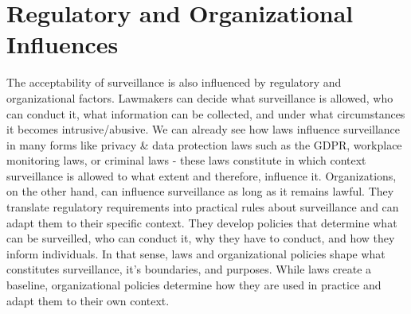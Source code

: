 \documentclass[12pt]{article}
\begin{document}
\section{Regulatory and Organizational Influences}
The acceptability of surveillance is also influenced by regulatory and organizational factors. Lawmakers can decide what surveillance is allowed, who can conduct it, what information can be collected, and under what circumstances it becomes intrusive/abusive. We can already see how laws influence surveillance in many forms like privacy \& data protection laws such as the GDPR, workplace monitoring laws, or criminal laws - these laws constitute in which context surveillance is allowed to what extent and therefore, influence it.
\newline
Organizations, on the other hand, can influence surveillance as long as it remains lawful. They translate regulatory requirements into practical rules about surveillance and can adapt them to their specific context. They develop policies that determine what can be surveilled, who can conduct it, why they have to conduct, and how they inform individuals.
\newline
In that sense, laws and organizational policies shape what constitutes surveillance, it's boundaries, and purposes. While laws create a baseline, organizational policies determine how they are used in practice and adapt them to their own context.
\end{document}
